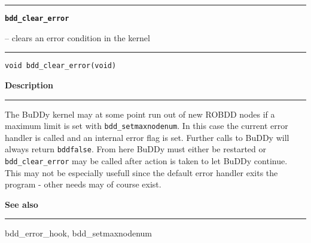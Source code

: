 \begin{minipage}{\textwidth}

\noindent\begin{minipage}{\textwidth}
\rule{\textwidth}{0.5mm}
{\tt\bf bdd\_clear\_error }
\--- clears an error condition in the kernel  \hspace{\fill}
\\\rule[1.5ex]{\textwidth}{0.5mm}
\end{minipage}

\noindent\begin{verbatim}
void bdd_clear_error(void) 
\end{verbatim}

\vspace{\parsep}\noindent
{\bf Description}\\\rule[1.5ex]{\textwidth}{0.2mm}\vspace{-1.5ex}\setlength{\parindent}{1em}
The BuDDy kernel may at some point run out of new ROBDD nodes if
           a maximum limit is set with {\tt bdd\_setmaxnodenum}. In this case
	   the current error handler is called and an internal error flag
	   is set. Further calls to BuDDy will always return {\tt bddfalse}.
	   From here BuDDy must either be restarted or {\tt bdd\_clear\_error}
	   may be called after action is taken to let BuDDy continue. This may
	   not be especially usefull since the default error handler exits
	   the program - other needs may of course exist.

\vspace{\parsep}\vspace{\baselineskip}\noindent
{\bf See also}\\\rule[1.5ex]{\textwidth}{0.2mm}\vspace{-1.5ex}
bdd\_error\_hook, bdd\_setmaxnodenum 
\end{minipage}
\vspace{8ex}
